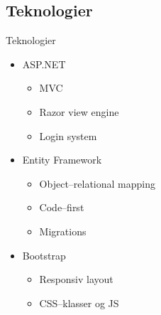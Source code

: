 		\subsection{Teknologier}
			\begin{frame}[t]{Teknologier} %
				\begin{itemize}
					\item<1> ASP.NET
					\begin{itemize}
						\item<1> MVC
						\item<1> Razor view engine
						\item<1> Login system
					\end{itemize}
					\item<2> Entity Framework
					\begin{itemize}
						\item<2> Object--relational mapping
						\item<2> Code--first
						\item<2> Migrations
					\end{itemize}
					\item<3> Bootstrap
					\begin{itemize}
						\item<3> Responsiv layout
						\item<3> CSS--klasser og JS
					\end{itemize}
				\end{itemize}
			\end{frame}

